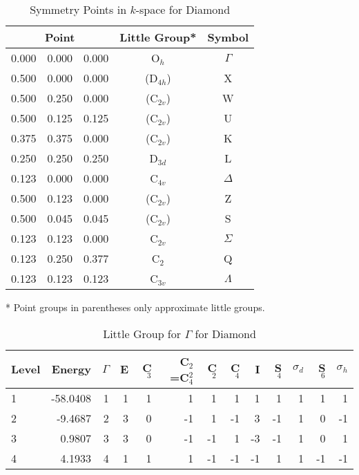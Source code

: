 \begin{table}
\begin{center}
\caption{\label{sod} Symmetry Points in $k$-space for Diamond}
\begin{tabular}{lllcc} \\ \hline
\multicolumn{3}{c}{Point} & Little Group* & Symbol\\ \hline
  0.000& 0.000& 0.000  & O$_h$ &  $\Gamma$\\
  0.500& 0.000& 0.000  & (D$_{4h}$)&X\\
  0.500& 0.250& 0.000  & (C$_{2v}$)&W\\
  0.500& 0.125& 0.125  & (C$_{2v}$)&U\\
  0.375& 0.375& 0.000  & (C$_{2v}$)&K\\
  0.250& 0.250& 0.250  & D$_{3d}$ &L\\
  0.123& 0.000& 0.000  & C$_{4v}$ &$\Delta $\\
  0.500& 0.123& 0.000  & (C$_{2v}$) &Z\\
  0.500& 0.045& 0.045  & (C$_{2v}$)&S\\
  0.123& 0.123& 0.000  & C$_{2v}$ &$\Sigma $\\
  0.123& 0.250& 0.377  &  C$_{2}$ &Q\\
  0.123& 0.123& 0.123  & C$_{3v}$ &$\Lambda $\\ \hline
\end{tabular}

* Point groups in parentheses only approximate little groups.\end{center}\end{table}
\begin{table}
\begin{center}
\caption{\label{lgd} Little Group for $\Gamma$ for Diamond}
\begin{tabular}{lrrrrrrrrrrrr}\\ \hline
Level & Energy & $\Gamma$ & E & C$_3$ & C$_2$=C$_4^2$ & C$_2$ & C$_4$
 & I & S$_4$ & $\sigma_d$ & S$_6$
&$\sigma_h$ \\ \hline
  1& -58.0408& 1& 1& 1& 1& 1 &1&1&1&1&1&1 \\
  2&  -9.4687& 2& 3& 0&-1& 1&-1&3&-1&1&0&-1 \\
  3&   0.9807& 3& 3& 0&-1&-1&1&-3&-1&1&0&1 \\
  4&   4.1933& 4& 1& 1& 1&-1&-1&-1&1&1&-1&-1\\ \hline
\end{tabular}\end{center} \end{table}

